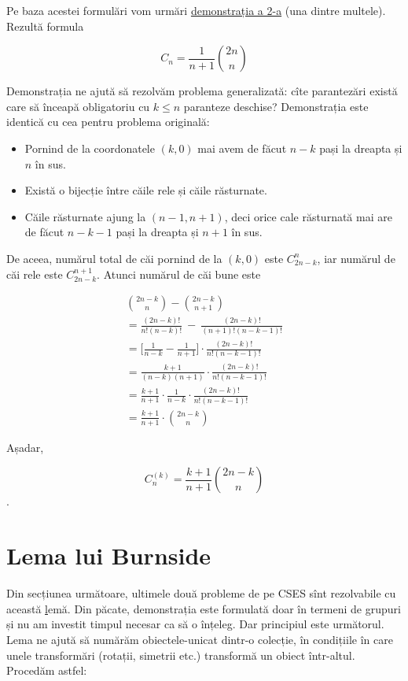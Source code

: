 \documentclass[../main.tex]{subfiles}
\begin{document}
Pe baza acestei formulări vom urmări \href{https://en.wikipedia.org/wiki/Catalan_number#Second_proof}{demonstrația a 2-a} (una dintre multele). Rezultă formula

$$C_n = \frac{1}{n + 1} \binom{2n}{n}$$

Demonstrația ne ajută să rezolvăm problema generalizată: cîte parantezări există care să înceapă obligatoriu cu $k \leq n$ paranteze deschise? Demonstrația este identică cu cea pentru problema originală:

\begin{itemize}
  \item Pornind de la coordonatele $(k,0)$ mai avem de făcut $n-k$ pași la dreapta și $n$ în sus.
  \item Există o bijecție între căile rele și căile răsturnate.
  \item Căile răsturnate ajung la $(n-1,n+1)$, deci orice cale răsturnată mai are de făcut $n-k-1$ pași la dreapta și $n+1$ în sus.
\end{itemize}

De aceea, numărul total de căi pornind de la $(k,0)$ este $C_{2n-k}^{n}$, iar numărul de căi rele este $C_{2n-k}^{n+1}$. Atunci numărul de căi bune este

\begingroup
\allowdisplaybreaks
\begin{gather*}
  \binom{2n-k}{n} - \binom{2n-k}{n+1}\\
  = \frac{(2n-k)!}{n!(n-k)!} \ - \ \frac{(2n-k)!}{(n+1)!(n-k-1)!}\\
  = \Big[\frac{1}{n-k} - \frac{1}{n+1}\Big] \cdot \frac{(2n-k)!}{n!(n-k-1)!}\\
  = \frac{k+1}{(n-k)(n+1)} \cdot \frac{(2n-k)!}{n!(n-k-1)!}\\
  = \frac{k+1}{n+1} \cdot \frac{1}{n-k} \cdot \frac{(2n-k)!}{n!(n-k-1)!}\\
  = \frac{k+1}{n+1} \cdot \binom{2n-k}{n}
\end{gather*}
\endgroup

Așadar,

$$C_n^{(k)} = \frac{k + 1}{n + 1} \binom{2n - k}{n}$$.

\section{Lema lui Burnside}

Din secțiunea următoare, ultimele două probleme de pe CSES sînt rezolvabile cu această \href{https://en.wikipedia.org/wiki/Burnside's_lemma}lemă. Din păcate, demonstrația este formulată doar în termeni de grupuri și nu am investit timpul necesar ca să o înțeleg. Dar principiul este următorul. Lema ne ajută să numărăm obiectele-unicat dintr-o colecție, în condițiile în care unele transformări (rotații, simetrii etc.) transformă un obiect într-altul. Procedăm astfel:
\end{document}
